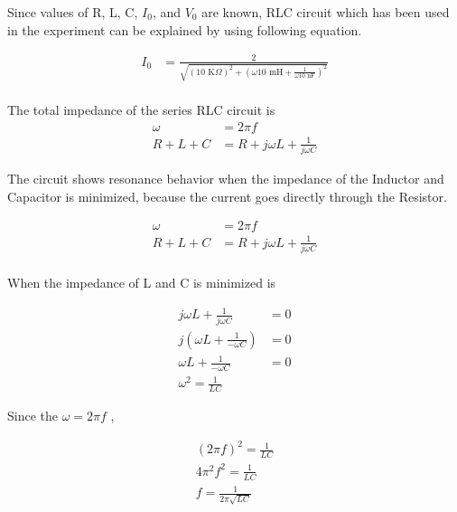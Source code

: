 \documentclass[12pt]{article}
\begin{document}
Since values of R, L, C, \(I_0\), and \(V_0\) are known, RLC circuit which has been used in the experiment can be explained by using following equation.

\begin{equation}
\begin{aligned}
    I_{0} &= \frac{2}{\sqrt{(10 \text{ K} \Omega )^2+(\omega 10 \text{ mH} + \frac{1}{\omega 10 \text{ nF}})^2}}\\
\end{aligned}
\end{equation}

The total impedance of the series RLC circuit is
\begin{equation}
\begin{aligned}
    \omega &= 2 \pi f \\
    R + L + C &= R + j \omega L + \frac{1}{j \omega C}
\end{aligned}
\end{equation}

The circuit shows resonance behavior when the impedance of the Inductor and Capacitor is minimized, because the current goes directly through the Resistor.

\begin{equation}
\begin{aligned}
    \omega &= 2 \pi f \\
    R + L + C &= R + j \omega L + \frac{1}{j \omega C} \\
\end{aligned}
\end{equation}

When the impedance of L and C is minimized is

\begin{equation}
\begin{aligned}
    j \omega L + \frac{1}{j \omega C} &= 0 \\
    j( \omega L + \frac{1}{- \omega C}) &= 0 \\
    \omega L + \frac{1}{- \omega C} &= 0 \\
    \omega ^2 = \frac{1}{LC}
\end{aligned}
\end{equation}

Since the \( \omega = 2 \pi f \) ,

\begin{equation}
\begin{aligned}
    (2 \pi f) ^2 = \frac{1}{LC} \\
    4 \pi ^2 f^2 = \frac{1}{LC} \\
    f = \frac{1}{2 \pi \sqrt{LC} } \\
\end{aligned}
\end{equation}
\end{document}
